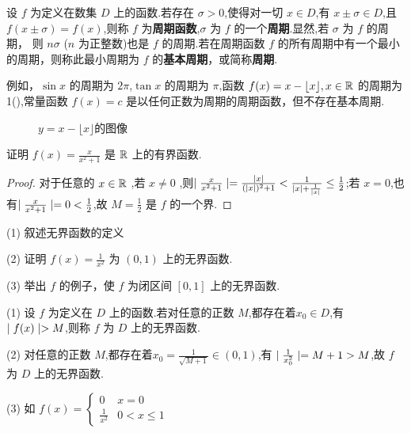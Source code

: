 \begin{definition}[周期函数]
    设 $f$ 为定义在数集 $D$ 上的函数.若存在 $\sigma>0$,使得对一切 $x\in D$,有 $x\pm \sigma \in D$,且 $f(x\pm \sigma)=f(x)$,则称 $f$ 为\textbf{周期函数},$\sigma$ 为 $f$ 的一个\textbf{周期}.显然,若 $\sigma$ 为 $f$ 的周期， 则 $n\sigma$ ($n$ 为正整数)也是 $f$ 的周期.若在周期函数 $f$ 的所有周期中有一个最小的周期，则称此最小周期为 $f$ 的\textbf{基本周期}，或简称\textbf{周期}.
\end{definition}
例如，$\sin x$ 的周期为 $2\pi$,$\tan x$ 的周期为 $\pi$,函数 $f(x)=x-\lfloor x \rfloor,x\in \mathbb{R}$ 的周期为 1(),常量函数 $f(x)=c$ 是以任何正数为周期的周期函数，但不存在基本周期.

\begin{figure}[htbp]
    \centering
    \caption{$y=x - \lfloor x \rfloor$的图像}
    \label{fig:xfloorfx}
\end{figure}

\homework

\begin{practice}
    证明 $f(x)=\frac{x}{x^2+1}$ 是 $\mathbb{R}$ 上的有界函数.
\end{practice}

\begin{proof}
    对于任意的 $x\in \mathbb{R}$ ,若 $x\ne 0$ ,则$\mid \frac{x}{x^2+1} \mid=\frac{\mid x \mid}{(\mid x \mid)^2+1}<\frac{1}{\mid x \mid+\frac{1}{\mid x \mid}}\le \frac{1}{2}$;若 $x=0$,也有$\mid \frac{x}{x^2+1} \mid=0<\frac{1}{2}$,故 $M=\frac{1}{2}$ 是 $f$ 的一个界.
\end{proof}

\begin{practice}
    (1) 叙述无界函数的定义

    (2) 证明 $f(x)=\frac{1}{x^2}$ 为 $(0,1)$ 上的无界函数.

    (3) 举出 $f$ 的例子，使 $f$ 为闭区间 $[0,1]$ 上的无界函数.
\end{practice}

\begin{solve}
    (1) 设 $f$ 为定义在 $D$ 上的函数.若对任意的正数 $M$,都存在着$x_0\in D$,有 $\mid f(x) \mid> M$,则称 $f$ 为 $D$ 上的无界函数.

    (2) 对任意的正数 $M$,都存在着$x_0=\frac{1}{\sqrt{M+1}}\in (0,1)$,有 $\mid \frac{1}{x_0^2} \mid=M+1> M$,故 $f$ 为 $D$ 上的无界函数.

    (3) 如 $f(x)=\begin{cases}
        0 & x=0 \\ 
        \frac{1}{x^2} & 0<x\le 1
    \end{cases}$
\end{solve}

